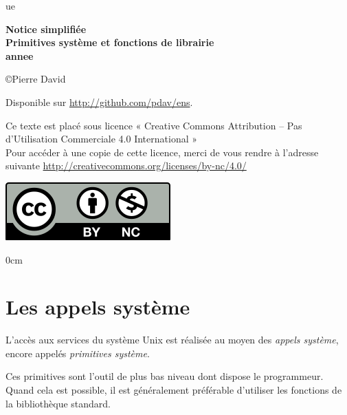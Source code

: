\documentclass [twoside] {report}
\newcommand {\tassertoc} {{ \setlength {\parskip} {0cm} \tableofcontents }}
\begin{document}
\thispagestyle {empty}

\begin {titlepage}
     {ue}

    \vfill

    \begin {center}
	\huge\bf
	Notice simplifiée \\
	\vspace* {5mm}
	Primitives système et fonctions de librairie \\
	\vspace* {5mm}
	 {annee}
    \end {center}

    \vfill

    \begin {center}
	\copyright Pierre David

	Disponible sur \url {http://github.com/pdav/ens}.

        Ce texte est placé sous licence « Creative Commons Attribution
	-- Pas d’Utilisation Commerciale 4.0 International » \\
	Pour accéder à une copie de cette licence,
	merci de vous rendre à l'adresse suivante
	\url {http://creativecommons.org/licenses/by-nc/4.0/}

	\includegraphics [scale=.5] {by-nc}
    \end {center}
\end {titlepage}

\cleardoublepage
\tassertoc



\cleardoublepage

\chapter {Les appels système}


L'accès aux services du système Unix est réalisée
au moyen des \textit {appels système}, encore appelés
\textit {primitives système}.

Ces primitives sont l'outil de plus bas niveau
dont dispose le programmeur. Quand cela est
possible, il est généralement préférable d'utiliser
les fonctions de la bibliothèque standard.
\end{document}
